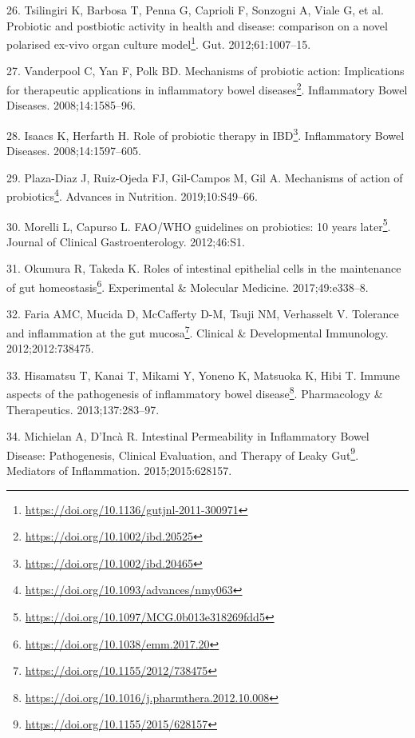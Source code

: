 \documentclass[
  12pt,
  a4paper,
  twoside,
  openright]{book}
\DeclareRobustCommand{\href}[2]{#2\footnote{\url{#1}}}
\newlength{\cslhangindent}
\newlength{\cslentryspacingunit} %
\newenvironment{CSLReferences}[2] %
 {%
  \setlength{\parindent}{0pt}
  \ifodd #1
  \let\oldpar\par
  \def\par{\hangindent=\cslhangindent\oldpar}
  \fi
  \setlength{\parskip}{#2\cslentryspacingunit}
 }%
 {}
\begin{document}
\begin{CSLReferences}{0}{0}
\leavevmode{}%
26. Tsilingiri K, Barbosa T, Penna G, Caprioli F, Sonzogni A, Viale G, et al. \href{https://doi.org/10.1136/gutjnl-2011-300971}{Probiotic and postbiotic activity in health and disease: comparison on a novel polarised ex-vivo organ culture model}. Gut. 2012;61:1007--15.

\leavevmode{}%
27. Vanderpool C, Yan F, Polk BD. \href{https://doi.org/10.1002/ibd.20525}{Mechanisms of probiotic action: Implications for therapeutic applications in inflammatory bowel diseases}. Inflammatory Bowel Diseases. 2008;14:1585--96.

\leavevmode{}%
28. Isaacs K, Herfarth H. \href{https://doi.org/10.1002/ibd.20465}{Role of probiotic therapy in IBD}. Inflammatory Bowel Diseases. 2008;14:1597--605.

\leavevmode{}%
29. Plaza-Diaz J, Ruiz-Ojeda FJ, Gil-Campos M, Gil A. \href{https://doi.org/10.1093/advances/nmy063}{Mechanisms of action of probiotics}. Advances in Nutrition. 2019;10:S49--66.

\leavevmode{}%
30. Morelli L, Capurso L. \href{https://doi.org/10.1097/MCG.0b013e318269fdd5}{FAO/WHO guidelines on probiotics: 10 years later}. Journal of Clinical Gastroenterology. 2012;46:S1.

\leavevmode{}%
31. Okumura R, Takeda K. \href{https://doi.org/10.1038/emm.2017.20}{Roles of intestinal epithelial cells in the maintenance of gut homeostasis}. Experimental \& Molecular Medicine. 2017;49:e338--8.

\leavevmode{}%
32. Faria AMC, Mucida D, McCafferty D-M, Tsuji NM, Verhasselt V. \href{https://doi.org/10.1155/2012/738475}{Tolerance and inflammation at the gut mucosa}. Clinical \& Developmental Immunology. 2012;2012:738475.

\leavevmode{}%
33. Hisamatsu T, Kanai T, Mikami Y, Yoneno K, Matsuoka K, Hibi T. \href{https://doi.org/10.1016/j.pharmthera.2012.10.008}{Immune aspects of the pathogenesis of inflammatory bowel disease}. Pharmacology \& Therapeutics. 2013;137:283--97.

\leavevmode{}%
34. Michielan A, D'Incà R. \href{https://doi.org/10.1155/2015/628157}{Intestinal Permeability in Inflammatory Bowel Disease: Pathogenesis, Clinical Evaluation, and Therapy of Leaky Gut}. Mediators of Inflammation. 2015;2015:628157.


\end{CSLReferences}
\end{document}
